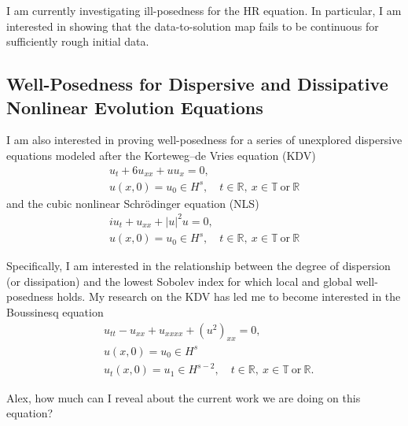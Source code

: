 \documentclass[12pt,reqno]{amsart}
\newcommand{\rr}{\mathbb{R}}
\newcommand{\ci}{\mathbb{T}}
\begin{document}
I am currently investigating ill-posedness for the HR equation. In particular, I
am interested in showing that the data-to-solution map fails to be continuous
for sufficiently rough initial data. 

\subsection{Well-Posedness for Dispersive and Dissipative \\
Nonlinear Evolution Equations} 
I am also interested in proving well-posedness for a series of unexplored dispersive equations modeled after the Korteweg–de Vries equation (KDV) 
\begin{gather*}
  u_{t} + 6u_{xx} + u u_{x} = 0,
  \\
  u(x,0) = u_{0} \in H^{s}, \quad t \in \rr, \ x \in \ci \ \text{or} \ \rr
\end{gather*}
%
%
and the cubic nonlinear Schr\"odinger
equation (NLS)
\begin{gather*}
  iu_{t} + u_{xx} + | u |^{2}u = 0,
\\
u(x,0) = u_{0} \in H^{s}, \quad t \in \rr, \ x \in \ci \ \text{or} \ \rr
\end{gather*}

Specifically, I am interested in the relationship between the degree of
dispersion (or dissipation) and the lowest Sobolev index for which local and
global well-posedness holds.
%
My research on the KDV has led me to become interested in the Boussinesq
equation
\begin{equation*}
  \begin{split}
  & u_{tt} - u_{xx} + u_{xxxx} + (u^{2})_{xx} = 0,
  \\
  & u(x,0) = u_{0} \in H^{s} \\
  & u_{t}(x,0) = u_{1} \in H^{s-2},
  \quad t \in \rr, \ x \in \ci \ \text{or} \ \rr.
\end{split}
\end{equation*}
\begin{framed}
Alex, how much can I reveal about the current work we are doing on
this equation?
\end{framed}
%
\end{document}

